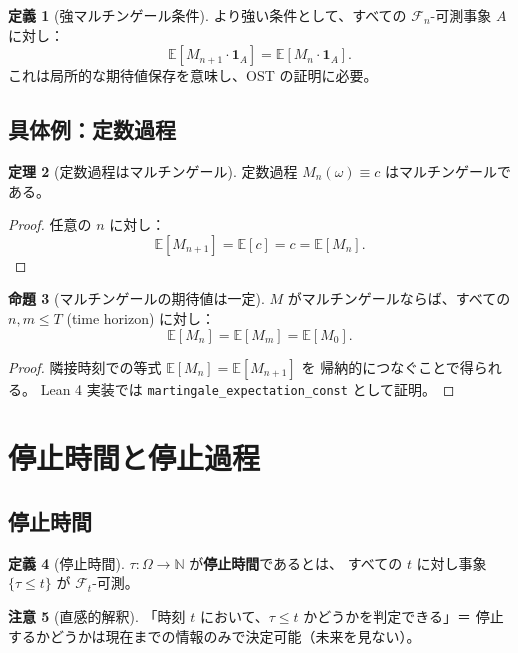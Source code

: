 \documentclass[a4paper,12pt]{ltjsarticle}
\theoremstyle{definition}
\newtheorem{definition}{定義}[section]
\newtheorem{theorem}[definition]{定理}
\newtheorem{proposition}[definition]{命題}
\newtheorem{remark}[definition]{注意}
\begin{document}
\begin{definition}[強マルチンゲール条件]
より強い条件として、すべての $\mathcal{F}_n$-可測事象 $A$ に対し：
\[
  \mathbb{E}[M_{n+1} \cdot \mathbf{1}_A] = \mathbb{E}[M_n \cdot \mathbf{1}_A].
\]
これは局所的な期待値保存を意味し、OST の証明に必要。
\end{definition}

\subsection{具体例：定数過程}

\begin{theorem}[定数過程はマルチンゲール]
定数過程 $M_n(\omega) \equiv c$ はマルチンゲールである。
\end{theorem}

\begin{proof}
任意の $n$ に対し：
\[
  \mathbb{E}[M_{n+1}] = \mathbb{E}[c] = c = \mathbb{E}[M_n].
\]
\end{proof}

\begin{proposition}[マルチンゲールの期待値は一定]
$M$ がマルチンゲールならば、すべての $n, m \leq T$ (time horizon) に対し：
\[
  \mathbb{E}[M_n] = \mathbb{E}[M_m] = \mathbb{E}[M_0].
\]
\end{proposition}

\begin{proof}
隣接時刻での等式 $\mathbb{E}[M_n] = \mathbb{E}[M_{n+1}]$ を
帰納的につなぐことで得られる。
Lean 4 実装では \texttt{martingale\_expectation\_const} として証明。
\end{proof}

\section{停止時間と停止過程}

\subsection{停止時間}

\begin{definition}[停止時間]
$\tau : \Omega \to \mathbb{N}$ が\textbf{停止時間}であるとは、
すべての $t$ に対し事象 $\{\tau \leq t\}$ が $\mathcal{F}_t$-可測。
\end{definition}

\begin{remark}[直感的解釈]
「時刻 $t$ において、$\tau \leq t$ かどうかを判定できる」＝
停止するかどうかは現在までの情報のみで決定可能（未来を見ない）。
\end{remark}
\end{document}
